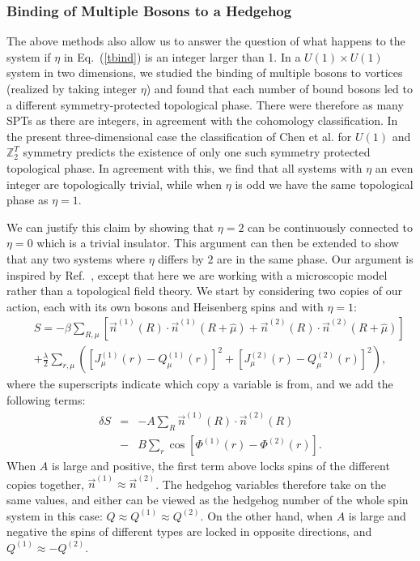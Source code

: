 \documentclass[prb,twocolumn]{revtex4-1}
\def\ztwot{\mathbb{Z}_2^T}
\begin{document}
\subsubsection{Binding of Multiple Bosons to a Hedgehog}
The above methods also allow us to answer the question of what happens to the system if $\eta$ in Eq.~(\ref{tbind}) is an integer larger than 1.  In a $U(1)\times U(1)$ system in two dimensions, we studied the binding of multiple bosons to vortices (realized by taking integer $\eta$) and found that each number of bound bosons led to a different symmetry-protected topological phase.\cite{FQHE} There were therefore as many SPTs as there are integers, in agreement with the cohomology classification.\cite{WenScience,*WenPRB, LuVishwanath} In the present three-dimensional case the classification of Chen et al.\cite{WenScience,*WenPRB} for $U(1)$ and $\ztwot$ symmetry predicts the existence of only one such symmetry protected topological phase.\cite{ChenNote} In agreement with this, we find that all systems with $\eta$ an even integer are topologically trivial, while when $\eta$ is odd we have the same topological phase as $\eta=1$. 

We can justify this claim by showing that $\eta=2$ can be continuously connected to $\eta=0$ which is a trivial insulator. This argument can then be extended to show that any two systems where $\eta$ differs by $2$ are in the same phase.  Our argument is inspired by Ref.~, except that here we are working with a microscopic model rather than a topological field theory.
We start by considering two copies of our action, each with its own bosons and Heisenberg spins and with $\eta=1$:
\begin{eqnarray}
&&S=-\beta\sum_{R,\mu}\left[ \vec{n}^{(1)}(R)\cdot \vec{n}^{(1)}(R+\hat{\mu})+\vec{n}^{(2)}(R)\cdot \vec{n}^{(2)}(R+\hat{\mu})\right]\nonumber\\
&&+\frac{\lambda}{2}\sum_{r,\mu}\left( [ J_\mu^{(1)}(r)- Q_\mu^{(1)}(r)]^2+[ J_\mu^{(2)}(r)- Q_\mu^{(2)}(r)]^2\right),
\label{doubleaction}
\end{eqnarray}
where the superscripts indicate which copy a variable is from, and we add the following terms:
\begin{eqnarray}
\delta S&=&-A\sum_{R} \vec{n}^{(1)}(R)\cdot \vec{n}^{(2)}(R)\nonumber\\
&-&B\sum_{r} \cos[\Phi^{(1)}(r)-\Phi^{(2)}(r)].
\label{AB}
\end{eqnarray} 
When $A$ is large and positive, the first term above locks spins of the different copies together, $\vec{n}^{(1)}\approx\vec{n}^{(2)}$. The hedgehog variables therefore take on the same values, and either can be viewed as the hedgehog number of the whole spin system in this case: $Q \approx Q^{(1)} \approx Q^{(2)}$. On the other hand, when $A$ is large and negative the spins of different types are locked in opposite directions, and $Q^{(1)} \approx -Q^{(2)}$.
\end{document}
